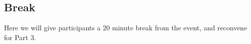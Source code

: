 \documentclass{article}
\begin{document}



\subsection{Break}
Here we will give participants a 20 minute break from the event, and reconvene for Part 3.
\end{document}
